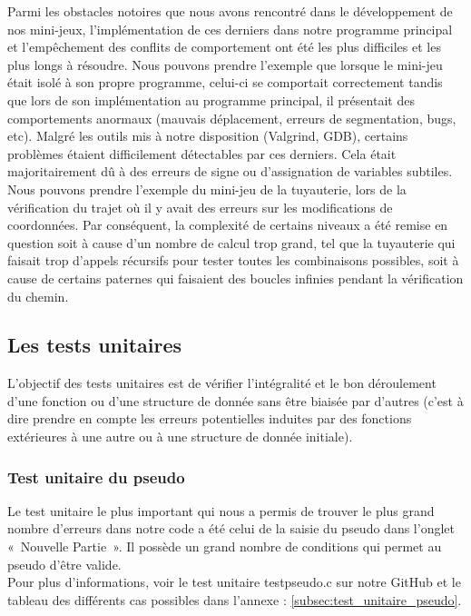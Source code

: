 \documentclass[12pt,a4paper]{article}
\begin{document}
            \tabto{1cm} Parmi les obstacles notoires que nous avons rencontré dans le développement de nos mini-jeux, l’implémentation de ces derniers dans notre programme principal et l'empêchement des conflits de comportement ont été les plus difficiles et les plus longs à résoudre. Nous pouvons prendre l'exemple que lorsque le mini-jeu était isolé à son propre programme, celui-ci se comportait correctement tandis que lors de son implémentation au programme principal, il présentait des comportements anormaux (mauvais déplacement, erreurs de segmentation, bugs, etc). Malgré les outils mis à notre disposition (Valgrind, GDB), certains problèmes étaient difficilement détectables par ces derniers. Cela était majoritairement dû à des erreurs de signe ou d’assignation de variables subtiles. Nous pouvons prendre l'exemple du mini-jeu de la tuyauterie, lors de la vérification du trajet où il y avait des erreurs sur les modifications de coordonnées. Par conséquent, la complexité de certains niveaux a été remise en question soit à cause d’un nombre de calcul trop grand, tel que la tuyauterie qui faisait trop d’appels récursifs pour tester toutes les combinaisons possibles, soit à cause de certains paternes qui faisaient des boucles infinies pendant la vérification du chemin.
            
         \subsection{Les tests unitaires}
            \tabto{1cm} L’objectif des tests unitaires est de vérifier l’intégralité et le bon déroulement d’une fonction ou d’une structure de donnée sans être biaisée par d’autres (c’est à dire prendre en compte les erreurs potentielles induites par des fonctions extérieures à une autre ou à une structure de donnée initiale).

            \subsubsection{Test unitaire du pseudo}
                \tabto{1cm} Le test unitaire le plus important qui nous a permis de trouver le plus grand nombre d'erreurs dans notre code a été celui de la saisie du pseudo dans l'onglet «~Nouvelle Partie~». Il possède un grand nombre de conditions qui permet au pseudo d'être valide.\\
                Pour plus d'informations, voir le test unitaire test\textunderscore pseudo.c sur notre GitHub et le tableau des différents cas possibles dans l'annexe : \ref{subsec:test_unitaire_pseudo}.
                
\end{document}
